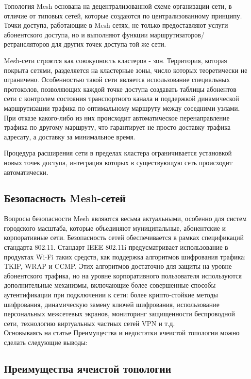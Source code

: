 \documentclass[a4paper]{article}
\begin{document}
Топология Mesh основана на децентрализованной схеме организации сети, в отличие от типовых сетей, которые создаются по централизованному принципу.
 Точки доступа, работающие в Mesh-сетях, не только предоставляют услуги абонентского доступа, но и выполняют функции маршрутизаторов/ретрансляторов для других точек доступа той же сети. 

Mesh-сети строятся как совокупность кластеров - зон. Территория, которая покрыта сетями, разделяется на кластерные зоны, число которых теоретически не ограничено. 
Особенностью такой сети является использование специальных протоколов, позволяющих каждой точке доступа создавать таблицы абонентов сети с контролем состояния транспортного канала и поддержкой динамической маршрутизации трафика по оптимальному маршруту между соседними узлами. 
При отказе какого-либо из них происходит автоматическое перенаправление трафика по другому маршруту, что гарантирует не просто доставку трафика адресату, а доставку за минимальное время.

Процедура расширения сети в пределах кластера ограничивается установкой новых точек доступа, интеграция которых в существующую сеть происходит автоматически.

\subsection{Безопасность Mesh-сетей}

Вопросы безопасности Mesh  являются весьма актуальными, особенно для систем городского масштаба, которые объединяют муниципальные, абонентские и корпоративные сети. 
Безопасность сетей обеспечивается в рамках спецификаций стандарта 802.11. Стандарт IEEE 802.11i предусматривает использование в продуктах Wi-Fi таких средств, как поддержка алгоритмов шифрования трафика: TKIP, WRAP и CCMP.
 Этих алгоритмов достаточно для защиты на уровне абонентского трафика, но на уровне корпоративного пользователя используются дополнительные механизмы, включающие более совершенные способы аутентификации при подключении к сети: более крипто-стойкие методы шифрования, динамическую замену ключей шифрования, использование персональных межсетевых экранов, мониторинг защищенности беспроводной сети, технологию виртуальных частных сетей VPN и т.д.
\\

 Основываясь на статье \href{https://www.geeksforgeeks.org/advantage-and-disadvantage-of-mesh-topology/}{Преимущества и недостатки ячеистой топологии} можно сделать следующие выводы:
 \subsection[]{Преимущества ячеистой топологии}
\end{document}
